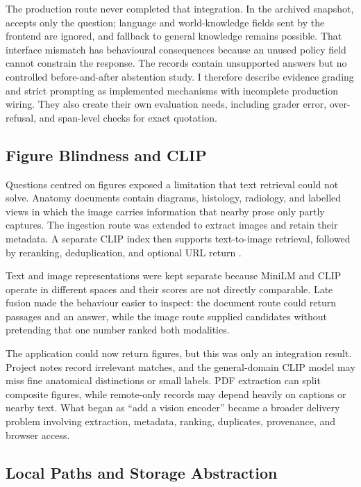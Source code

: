 The production route never completed that integration. In the archived snapshot,  accepts only the question; language and world-knowledge fields sent by the frontend are ignored, and fallback to general knowledge remains possible. That interface mismatch has behavioural consequences because an unused policy field cannot constrain the response. The records contain unsupported answers but no controlled before-and-after abstention study. I therefore describe evidence grading and strict prompting as implemented mechanisms with incomplete production wiring. They also create their own evaluation needs, including grader error, over-refusal, and span-level checks for exact quotation.

\subsection{Figure Blindness and CLIP}
\label{sec:evolution-clip}

Questions centred on figures exposed a limitation that text retrieval could not solve. Anatomy documents contain diagrams, histology, radiology, and labelled views in which the image carries information that nearby prose only partly captures. The ingestion route was extended to extract images and retain their metadata. A separate CLIP index then supports text-to-image retrieval, followed by reranking, deduplication, and optional URL return \parencite{radford2021}.

Text and image representations were kept separate because MiniLM and CLIP operate in different spaces and their scores are not directly comparable. Late fusion made the behaviour easier to inspect: the document route could return passages and an answer, while the image route supplied candidates without pretending that one number ranked both modalities.

The application could now return figures, but this was only an integration result. Project notes record irrelevant matches, and the general-domain CLIP model may miss fine anatomical distinctions or small labels. PDF extraction can split composite figures, while remote-only records may depend heavily on captions or nearby text. What began as ``add a vision encoder'' became a broader delivery problem involving extraction, metadata, ranking, duplicates, provenance, and browser access.

\subsection{Local Paths and Storage Abstraction}
\label{sec:evolution-storage}


